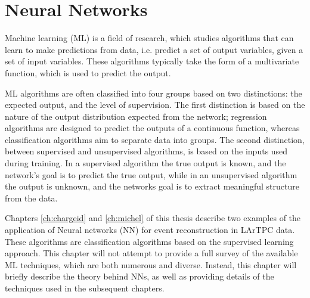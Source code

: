 \chapter{\label{ch:ml}Neural Networks} 

\minitoc

Machine learning (ML) is a field of research, which studies algorithms that
can learn to make predictions from data, i.e. predict a set of output variables,
given a set of input variables. These algorithms typically take the form of a
multivariate function, which is used to predict the output\cite{Reed1999}.

ML algorithms are often classified into four groups based on two distinctions:
the expected output, and the level of supervision. The first distinction is 
based on the nature of the output distribution expected from the network; 
regression algorithms are designed to predict the outputs of a continuous 
function, whereas classification algorithms aim to separate data into groups. 
The second distinction, between supervised and unsupervised algorithms, is 
based on the inputs used during training. In a supervised algorithm the true 
output is known, and the network's goal is to predict the true output, while 
in an unsupervised algorithm the output is unknown, and the networks goal is 
to extract meaningful structure from the data\cite{Lecun2015}.

Chapters \ref{ch:chargeid} and \ref{ch:michel} of this thesis describe two 
examples of the application of Neural networks (NN) for event reconstruction 
in LArTPC data. These algorithms are classification algorithms based on the
supervised learning approach. This chapter will not attempt to provide a full 
survey of the available ML techniques, which are both numerous and diverse. 
Instead, this chapter will briefly describe the theory behind NNs, as well as 
providing details of the techniques used in the subsequent chapters. 

